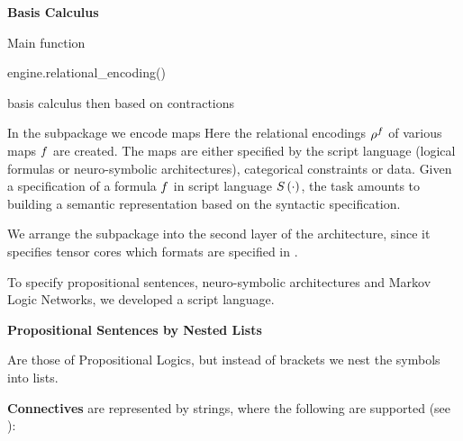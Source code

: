 \textbf{Basis Calculus}

Main function 
\begin{centeredcode}
	engine.relational\_encoding()
\end{centeredcode}
basis calculus then based on contractions






In the \spencoding subpackage we encode maps 
Here the relational encodings $\rho^{f}$ of various maps $f$ are created.
%
The maps are either specified by the script language (logical formulas or neuro-symbolic architectures), categorical constraints or data.
Given a specification of a formula $f$ in script language $S\left(\cdot\right)$, the task amounts to building a semantic representation based on the syntactic specification.

We arrange the \spencoding subpackage into the second layer of the \tnreason architecture, since it specifies tensor cores which formats are specified in \spengine.


\label{subsec:scriptLanguage} %

To specify propositional sentences, neuro-symbolic architectures and Markov Logic Networks, we developed a script language.

\textbf{Propositional Sentences by Nested Lists}

Are those of Propositional Logics, but instead of brackets we nest the symbols into lists.

\textbf{Connectives} are represented by strings, where the following are supported (see ):
\begin{center}
\end{center}

